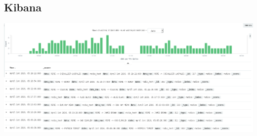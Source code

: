 \documentclass{beamer}
\begin{document}
\subsection{Kibana}

\begin{frame}
	\begin{center}
		\includegraphics[scale=0.20]{frequence.png}
	\end{center}
\end{frame}
\end{document}
